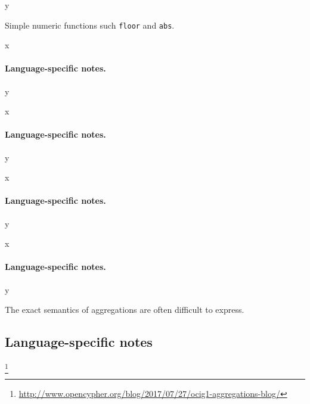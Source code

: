 y

Simple numeric functions such \texttt{floor} and \texttt{abs}.




x

\noindent\paragraph{Language-specific notes.}

y




x

\noindent\paragraph{Language-specific notes.}

y




x

\noindent\paragraph{Language-specific notes.}

y




x

\noindent\paragraph{Language-specific notes.}

y

The exact semantics of aggregations are often difficult to express.

\subsection*{Language-specific notes}

\footnote{\url{http://www.opencypher.org/blog/2017/07/27/ocig1-aggregations-blog/}}



